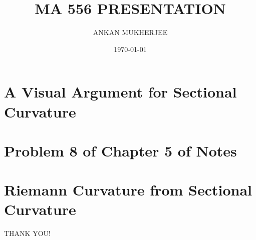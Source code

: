 \documentclass{beamer}
\title{MA 556 PRESENTATION}
\author{ANKAN MUKHERJEE}
\institute{IIT BOMBAY}
\date{\today}
\begin{document}
\frame{\titlepage}

\section{A Visual Argument for Sectional Curvature}

\section{Problem 8 of Chapter 5 of Notes}

\section{Riemann Curvature from Sectional Curvature}





\begin{frame}
\begin{center}
THANK YOU!
\end{center}
\end{frame}


\end{document}
